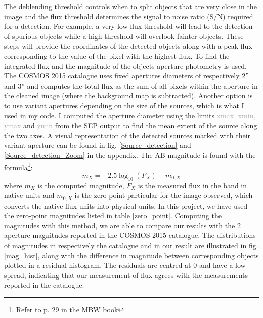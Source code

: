 The deblending threshold controls when to split objects that are very close in the image and the flux threshold determines the signal to noise ratio (S/N) required for a detection. For example, a very low flux threshold will lead to the detection of spurious objects while a high threshold will overlook fainter objects. These steps will provide the coordinates of the detected objects along with a peak flux corresponding  to the value of the pixel with the highest flux. To find the integrated flux and the magnitude of the objects aperture photometry is used. The COSMOS 2015 catalogue uses fixed apertures diameters of respectively 2'' and 3'' and computes the total flux as the sum of all pixels within the aperture in the cleaned image (where the background map is subtracted). Another option is to use variant apertures depending on the size of the sources, which is what I used in my code. I computed the aperture diameter using the limits \textcolor{darkgray}{xmax, xmin, ymax} and \textcolor{darkgray}{ymin} from the SEP output to find the mean extent of the source along the two axes. A visual representation of the detected sources marked with their variant aperture can be found in fig. \ref{Source_detection} and \ref{Source_detection_Zoom} in the appendix. The AB magnitude is found with the formula\footnote{Refer to p. 29 in the MBW book}:
\begin{equation}
    m_X = -2.5\log_{10}(F_X) + m_{0,X}
\end{equation}
where $m_X$ is the computed magnitude, $F_X$ is the measured flux in the band in native units and $m_{0,X}$ is the zero-point particular for the image observed, which converts the native flux units into physical units. In this project, we have used the zero-point magnitudes listed in table \ref{zero_point}. Computing the magnitudes with this method, we are able to compare our results with the 2 aperture magnitudes reported in the COSMOS 2015 catalogue. The distributions of magnitudes in respectively the catalogue and in our result are illustrated in fig.\ref{mag_hist}, along with the difference in magnitude between corresponding objects plotted in a residual histogram. The residuals are centred at 0 and have a low spread, indicating that our measurement of flux agrees with the measurements reported in the catalogue.
